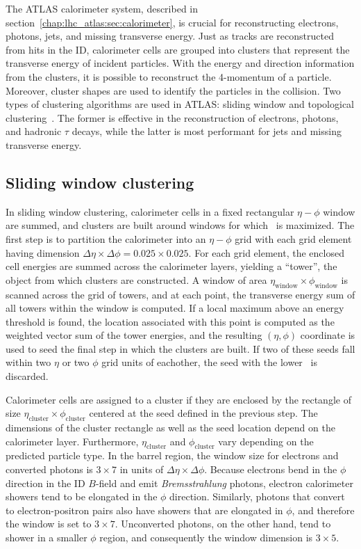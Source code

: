 
The ATLAS calorimeter system, described in section~\ref{chap:lhc_atlas:sec:calorimeter}, is crucial
for reconstructing electrons, photons, jets, and missing transverse
energy. Just as tracks are reconstructed from hits in the ID,
calorimeter cells are grouped into clusters that represent the
transverse energy of incident particles. With the energy and direction
information from the clusters, it is possible to reconstruct the
4-momentum of a particle. Moreover, cluster shapes are used to identify
the particles in the collision. Two types of clustering algorithms are
used in ATLAS: sliding window and topological clustering~\cite{bib:Lampl:2008zz}. The former
is effective in the reconstruction of electrons, photons, and hadronic
$\tau$ decays, while the latter is most performant for jets and
missing transverse energy.

\subsection{Sliding window clustering}
\label{chap:reconstruction:sec:cluster:subsec:sliding_window}

In sliding window clustering, calorimeter cells in a fixed rectangular
$\eta-\phi$ window are summed, and clusters are built around windows
for which \et~is maximized. The first step is to partition the
calorimeter into an $\eta-\phi$ grid with each grid element having dimension
$\Delta{\eta}\times \Delta{\phi} = 0.025 \times 0.025$. For each grid
element, the enclosed cell energies are summed across the calorimeter layers,
yielding a ``tower'', the object from which clusters are
constructed. A window of area $\eta_{\textrm{window}} \times
\phi_{\textrm{window}}$ is scanned across the grid of towers, and at
each point, the transverse energy sum of all towers within the window
is computed. If a local maximum above an energy threshold is found, the location associated with
this point is computed as the weighted vector sum of the tower
energies, and the resulting $(\eta,\phi)$ coordinate is used to seed the final step in which the
clusters are built. If two of these seeds fall within two $\eta$ or
two $\phi$ grid units of eachother, the seed with the lower \et~is
discarded. 

Calorimeter cells are assigned to a cluster if they are enclosed by the
rectangle of size $\eta_{\textrm{cluster}} \times
\phi_{\textrm{cluster}}$ centered at the seed defined in the previous
step. The dimensions of the cluster rectangle as well as the seed
location depend on the calorimeter layer. Furthermore,
$\eta_{\textrm{cluster}}$ and $\phi_{\textrm{cluster}}$ vary depending on
the predicted particle type. In the barrel region, the window size for electrons and
converted photons is $3 \times 7$ in units of $\Delta{\eta}\times
\Delta{\phi}$. Because electrons bend in the $\phi$ direction in the ID
$B$-field and emit {\it Bremsstrahlung} photons, electron calorimeter
showers tend to be elongated in the $\phi$ direction. Similarly,
photons that convert to electron-positron pairs also have showers that
are elongated in $\phi$, and therefore the window is set to $3 \times
7$. Unconverted photons, on the other hand, tend to shower in a
smaller $\phi$ region, and consequently the window dimension is $3
\times 5$. 

